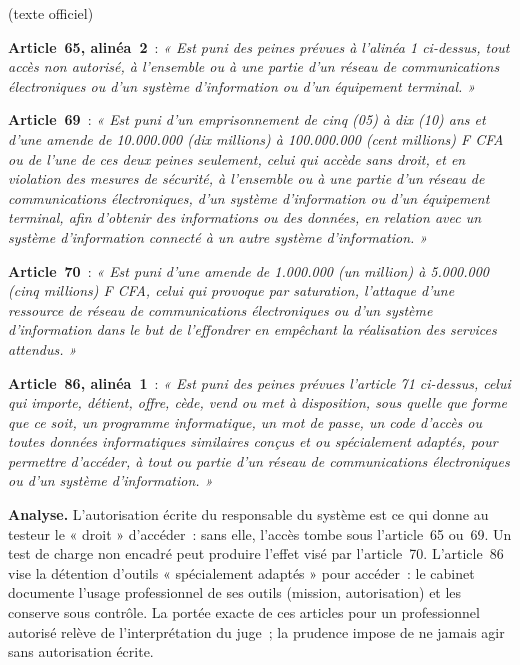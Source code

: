 \begin{boxjuris}
\textbf{} (texte officiel)

\medskip
\textbf{Article~65, alinéa~2}~: \textit{« Est puni des peines prévues à
l'alinéa 1 ci-dessus, tout accès non autorisé, à l'ensemble ou à une
partie d'un réseau de communications électroniques ou d'un système
d'information ou d'un équipement terminal. »}

\medskip
\textbf{Article~69}~: \textit{« Est puni d'un emprisonnement de cinq (05) à
dix (10) ans et d'une amende de 10.000.000 (dix millions) à 100.000.000
(cent millions) F CFA ou de l'une de ces deux peines seulement, celui qui
accède sans droit, et en violation des mesures de sécurité, à l'ensemble
ou à une partie d'un réseau de communications électroniques, d'un système
d'information ou d'un équipement terminal, afin d'obtenir des informations
ou des données, en relation avec un système d'information connecté à un
autre système d'information. »}

\medskip
\textbf{Article~70}~: \textit{« Est puni d'une amende de 1.000.000 (un
million) à 5.000.000 (cinq millions) F CFA, celui qui provoque par
saturation, l'attaque d'une ressource de réseau de communications
électroniques ou d'un système d'information dans le but de l'effondrer en
empêchant la réalisation des services attendus. »}

\medskip
\textbf{Article~86, alinéa~1}~: \textit{« Est puni des peines prévues
l'article 71 ci-dessus, celui qui importe, détient, offre, cède, vend ou
met à disposition, sous quelle que forme que ce soit, un programme
informatique, un mot de passe, un code d'accès ou toutes données
informatiques similaires conçus et ou spécialement adaptés, pour permettre
d'accéder, à tout ou partie d'un réseau de communications électroniques ou
d'un système d'information. »}

\medskip
\textbf{Analyse.} L'autorisation écrite du responsable du système est ce
qui donne au testeur le « droit » d'accéder~: sans elle, l'accès tombe sous
l'article~65 ou~69. Un test de charge non encadré peut produire l'effet visé
par l'article~70. L'article~86 vise la détention d'outils « spécialement
adaptés » pour accéder~: le cabinet documente l'usage professionnel de ses
outils (mission, autorisation) et les conserve sous contrôle. La portée
exacte de ces articles pour un professionnel autorisé relève de
l'interprétation du juge~; la prudence impose de ne jamais agir sans
autorisation écrite.
\end{boxjuris}

